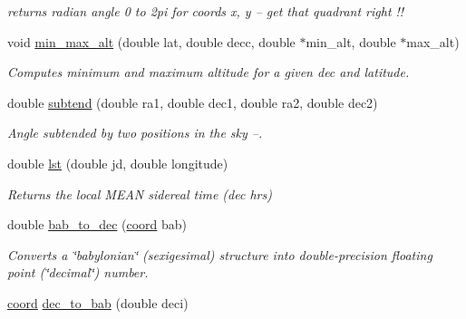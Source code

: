 \begin{DoxyCompactItemize}
\begin{DoxyCompactList}\small\item\em returns radian angle 0 to 2pi for coords x, y -- get that quadrant right !! \end{DoxyCompactList}\item 
\hypertarget{class_astronomy_a59aaa2bb41565091dc4a0fa1df03af72}{void \hyperlink{class_astronomy_a59aaa2bb41565091dc4a0fa1df03af72}{min\-\_\-max\-\_\-alt} (double lat, double decc, double $\ast$min\-\_\-alt, double $\ast$max\-\_\-alt)}\label{class_astronomy_a59aaa2bb41565091dc4a0fa1df03af72}

\begin{DoxyCompactList}\small\item\em Computes minimum and maximum altitude for a given dec and latitude. \end{DoxyCompactList}\item 
double \hyperlink{class_astronomy_aec809bd98d61dc0039e8794ffe55f7e5}{subtend} (double ra1, double dec1, double ra2, double dec2)
\begin{DoxyCompactList}\small\item\em Angle subtended by two positions in the sky --. \end{DoxyCompactList}\item 
double \hyperlink{class_astronomy_a3266f3771c39969b737e58d90d37593c}{lst} (double jd, double longitude)
\begin{DoxyCompactList}\small\item\em Returns the local M\-E\-A\-N sidereal time (dec hrs) \end{DoxyCompactList}\item 
\hypertarget{class_astronomy_a130ccda25a57a6aa98834daca603d474}{double \hyperlink{class_astronomy_a130ccda25a57a6aa98834daca603d474}{bab\-\_\-to\-\_\-dec} (\hyperlink{struct_astronomy_1_1coord}{coord} bab)}\label{class_astronomy_a130ccda25a57a6aa98834daca603d474}

\begin{DoxyCompactList}\small\item\em Converts a \char`\"{}babylonian\char`\"{} (sexigesimal) structure into double-\/precision floating point (\char`\"{}decimal\char`\"{}) number. \end{DoxyCompactList}\item 
\hypertarget{class_astronomy_af589aaee13587e1c081142ae3d0094ed}{\hyperlink{struct_astronomy_1_1coord}{coord} \hyperlink{class_astronomy_af589aaee13587e1c081142ae3d0094ed}{dec\-\_\-to\-\_\-bab} (double deci)}\label{class_astronomy_af589aaee13587e1c081142ae3d0094ed}


\end{DoxyCompactItemize}

